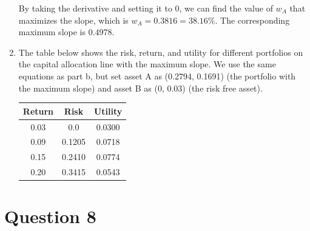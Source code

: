 \documentclass[a4paper]{article}
\begin{document}
\begin{enumerate}[label=(\alph*)]
    By taking the derivative and setting it to 0, we can find the value of $w_A$ that maximizes the slope, which is $w_A = 0.3816 = 38.16\%$. The corresponding maximum slope is $0.4978$.

    \vspace{5mm}
    \item The table below shows the risk, return, and utility for different portfolios on the capital allocation line with the maximum slope. We use the same equations as part b, but set asset A as (0.2794, 0.1691) (the portfolio with the maximum slope) and asset B as (0, 0.03) (the risk free asset).
    
    \begin{table}[h]
        \centering
        \begin{tabular}{|c|c|c|}
            \hline
            Return & Risk & Utility \\
            \hline
            0.03 & 0.0 & 0.0300 \\
            \hline
            0.09 & 0.1205 & 0.0718 \\
            \hline
            0.15 & 0.2410 & 0.0774 \\
            \hline
            0.20 & 0.3415 & 0.0543 \\
            \hline
        \end{tabular}
    \end{table}

\end{enumerate}


\newpage

\section*{Question 8}
\end{document}
